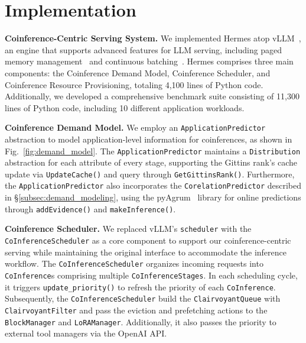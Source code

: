 \section{Implementation}
\label{sec:implementation}

\vspace{.3em}
\noindent\textbf{Coinference-Centric Serving System.} We implemented Hermes atop vLLM~\cite{kwon2023efficient}, an engine that supports advanced features for LLM serving, including paged memory management~\cite{kwon2023efficient} and continuous batching~\cite{yu_orca_2022}. Hermes comprises three main components: the Coinference Demand Model, Coinference Scheduler, and Coinference Resource Provisioning, totaling 4,100 lines of Python code. Additionally, we developed a comprehensive benchmark suite consisting of 11,300 lines of Python code, including 10 different application workloads.

\vspace{.3em}
\noindent\textbf{Coinference Demand Model.} 
We employ an \texttt{ApplicationPredictor} abstraction to model application-level information for coinferences, as shown in Fig.~\ref{fig:demand_model}. The \texttt{ApplicationPredictor} maintains a \texttt{Distribution} abstraction for each attribute of every stage, supporting the Gittins rank's cache update via \texttt{UpdateCache()} and query through \texttt{GetGittinsRank()}. Furthermore, the \texttt{ApplicationPredictor} also incorporates the \texttt{CorelationPredictor} described in \S\ref{subsec:demand_modeling}, using the pyAgrum~\cite{ducamp2020agrum} library for online predictions through \texttt{addEvidence()} and \texttt{makeInference()}.

\vspace{.3em}
\noindent\textbf{Coinference Scheduler.} 
We replaced vLLM's \texttt{scheduler} with the \texttt{CoInferenceScheduler} as a core component to support our coinference-centric serving while maintaining the original interface to accommodate the inference workflow. The \texttt{CoInferenceScheduler} organizes incoming requests into \texttt{CoInference}s comprising multiple \texttt{CoInferenceStages}. In each scheduling cycle, it triggers \texttt{update\_priority()} to refresh the priority of each \texttt{CoInference}. Subsequently, the \texttt{CoInferenceScheduler} build the \texttt{ClairvoyantQueue} with \texttt{ClairvoyantFilter} and pass the eviction and prefetching actions to the \texttt{BlockManager} and \texttt{LoRAManager}. Additionally, it also passes the priority to external tool managers via the OpenAI API.

